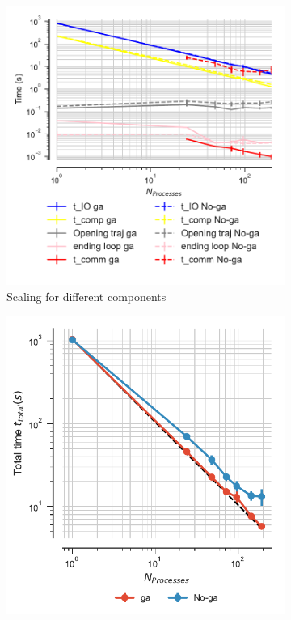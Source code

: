 \begin{figure}[ht!]
\centering
\begin{subfigure}{.32\textwidth}
  \includegraphics[width=\linewidth]{figures/Comparison_IO_compute_scaling_traj_splitting.pdf}
  \captionsetup{format=hang}
  \caption{Scaling for different components}
  \label{fig:ScalingComputeIO-split}
\end{subfigure}
\hfill
\begin{subfigure}{.3\textwidth}
  \includegraphics[width=\linewidth]{figures/Comparison_tot_time_traj_splitting.pdf}

\end{subfigure}
\end{figure}
